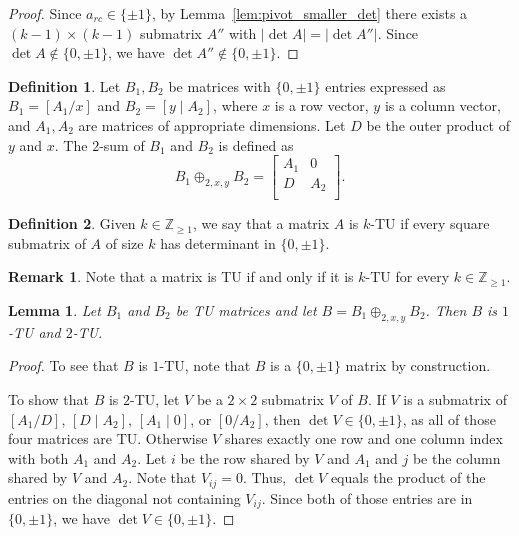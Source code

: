 \documentclass{article}
\newtheorem{lemma}{Lemma}
\theoremstyle{definition}
\newtheorem{definition}{Definition}
\newtheorem{remark}{Remark}
\begin{document}
\begin{proof}
    Since $a_{rc} \in \{\pm 1\}$, by Lemma~\ref{lem:pivot_smaller_det} there exists a $(k - 1) \times (k - 1)$ submatrix $A''$ with $|\det A| = |\det A''|$. Since $\det A \notin \{0, \pm 1\}$, we have $\det A'' \notin \{0, \pm 1\}$.
\end{proof}

\begin{definition}\label{def:two_sum}
    Let $B_{1}, B_{2}$ be matrices with $\{0, \pm 1\}$ entries expressed as $B_{1} = \left[A_{1} / x\right]$ and $B_{2} = \left[y \mid A_{2}\right]$, where $x$ is a row vector, $y$ is a column vector, and $A_{1}, A_{2}$ are matrices of appropriate dimensions. Let $D$ be the outer product of $y$ and $x$. The $2$-sum of $B_{1}$ and $B_{2}$ is defined as
    \[
        B_{1} \oplus_{2, x, y} B_{2} = \begin{bmatrix}
            A_{1} & 0 \\
            D & A_{2} \\
        \end{bmatrix}.
    \]
\end{definition}

\begin{definition}
    Given $k \in \mathbb{Z}_{\geq 1}$, we say that a matrix $A$ is $k$-TU if every square submatrix of $A$ of size $k$ has determinant in $\{0, \pm 1\}$.
\end{definition}

\begin{remark}
    Note that a matrix is TU if and only if it is $k$-TU for every $k \in \mathbb{Z}_{\geq 1}$.
\end{remark}

\begin{lemma}\label{lem:two_sum_reg_det_12}
    Let $B_{1}$ and $B_{2}$ be TU matrices and let $B = B_{1} \oplus_{2, x, y} B_{2}$. Then $B$ is $1$-TU and $2$-TU.
\end{lemma}

\begin{proof}
    To see that $B$ is $1$-TU, note that $B$ is a $\{0, \pm 1\}$ matrix by construction.

    To show that $B$ is $2$-TU, let $V$ be a $2 \times 2$ submatrix $V$ of $B$. If $V$ is a submatrix of $\left[A_{1} / D\right]$, $\left[D \mid A_{2}\right]$, $\left[A_{1} \mid 0\right]$, or $\left[0 / A_{2}\right]$, then $\det V \in \{0, \pm 1\}$, as all of those four matrices are TU. Otherwise $V$ shares exactly one row and one column index with both $A_{1}$ and $A_{2}$. Let $i$ be the row shared by $V$ and $A_{1}$ and $j$ be the column shared by $V$ and $A_{2}$. Note that $V_{ij} = 0$. Thus, $\det V$ equals the product of the entries on the diagonal not containing $V_{ij}$. Since both of those entries are in $\{0, \pm 1\}$, we have $\det V \in \{0, \pm 1\}$.
\end{proof}
\end{document}
